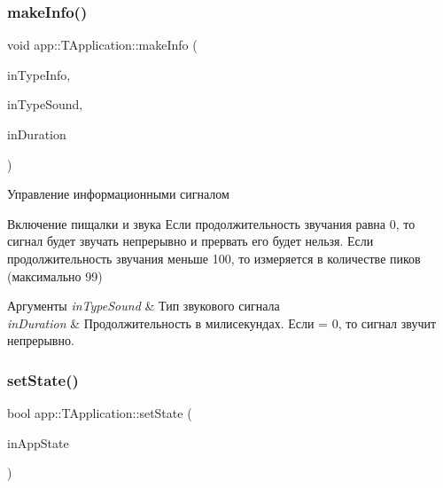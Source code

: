 \subsubsection{\texorpdfstring{make\+Info()}{makeInfo()}}
{\footnotesize\ttfamily void app\+::\+T\+Application\+::make\+Info (\begin{DoxyParamCaption}\item[{const \hyperlink{group___xD0_x9F_xD0_xB5_xD1_x80_xD0_xB5_xD1_x87_xD0_xB8_xD1_x81_xD0_xBB_xD0_xB5_xD0_xBD_xD0_xB8_xD1_x8F_gaf2797b8ed91d66a25b1b3b05ea7bcfc2}{app\+::type\+Info}}]{in\+Type\+Info,  }\item[{const \hyperlink{group___xD0_x9F_xD0_xB5_xD1_x80_xD0_xB5_xD1_x87_xD0_xB8_xD1_x81_xD0_xBB_xD0_xB5_xD0_xBD_xD0_xB8_xD1_x8F_ga33d8f1a04a907b6c65c5dfc88280ac6f}{app\+::type\+Sound}}]{in\+Type\+Sound,  }\item[{const uint32\+\_\+t}]{in\+Duration }\end{DoxyParamCaption})}



Управление информационными сигналом 

Включение пищалки и звука Если продолжительность звучания равна 0, то сигнал будет звучать непрерывно и прервать его будет нельзя. Если продолжительность звучания меньше 100, то измеряется в количестве пиков (максимально 99) 
\begin{DoxyParams}{Аргументы}
{\em in\+Type\+Sound} & Тип звукового сигнала \\
\hline
{\em in\+Duration} & Продолжительность в милисекундах. Если = 0, то сигнал звучит непрерывно. \\
\hline
\end{DoxyParams}
\mbox{\label{classapp_1_1_t_application_a3df1835103a3ba338821c27ad05f9f8d}} 
\subsubsection{\texorpdfstring{set\+State()}{setState()}}
{\footnotesize\ttfamily bool app\+::\+T\+Application\+::set\+State (\begin{DoxyParamCaption}\item[{\hyperlink{group___xD0_x9F_xD0_xB5_xD1_x80_xD0_xB5_xD1_x87_xD0_xB8_xD1_x81_xD0_xBB_xD0_xB5_xD0_xBD_xD0_xB8_xD1_x8F_ga290e8080c661e52c2f685fd4af148acf}{app\+::app\+State}}]{in\+App\+State }\end{DoxyParamCaption})}




